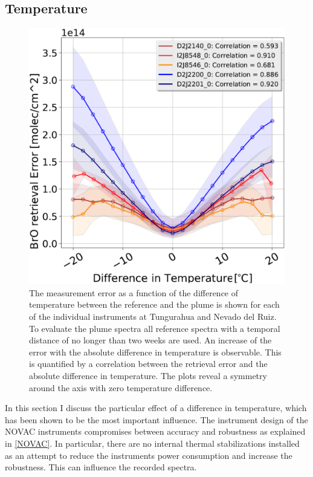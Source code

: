 \subsection{Temperature}
\begin{figure}
	\centering
	\includegraphics[width=0.7\linewidth]{Bilder/DiffTempallInstruments1}
	\caption[The  measurement error as a function of the difference of temperature between the reference and the plume is shown for each of the individual instruments at Tungurahua and Nevado del Ruiz.]{The  measurement error as a function of the difference of temperature between the reference and the plume is shown for each of the individual instruments at Tungurahua and Nevado del Ruiz. To evaluate the plume spectra all reference spectra with a temporal distance of no longer than two weeks are used. An increase of the  error with the absolute difference in temperature is observable. This is quantified by a correlation between the  retrieval error and the absolute difference in temperature. The plots reveal a symmetry around the axis with zero temperature difference.}
	\label{fig:difftemp}
\end{figure}
In this section I discuss the particular effect of a difference in temperature, which has been shown to be the most important influence.
The instrument design of the NOVAC instruments compromises between accuracy and robustness as explained in \cref{NOVAC}. In particular, there are no internal thermal stabilizations installed as an attempt to reduce the instruments power consumption and increase the robustness. This can influence the recorded spectra.\\
